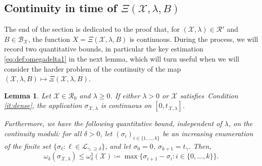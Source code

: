 \documentclass[11pt]{article}
\newtheorem{lemma}[theorem]{Lemma}
\def\Conf{{\mathscr{R}}}
\def\Att{{\Xi}}
\begin{document}
\subsection{Continuity in time of \texorpdfstring{$\Att(\mathcal{X},\lambda,B)$}{Xi(gamma,L,lambda,B)}}
\label{sub:cont}
The end of the section is dedicated to the proof that, for $(\mathcal{X},\lambda)\in \Conf'$ and $B\in\mathcal{B}_\mathcal{X}$, the function $X=\Att(\mathcal{X},\lambda,B)$ is continuous. During the process, we will record two quantitative bounds, in particular the key estimation \eqref{eq:def:omegadelta1} in the next lemma, which will turn useful when we will consider the harder problem of the continuity of the map $(\mathcal{X},\lambda,B)\mapsto \Att(\mathcal{X},\lambda,B)$.
\begin{lemma}
\label{le:sigmaIsCont}
  Let $\mathcal{X}\in \Conf_0$ and $\lambda\geq 0$.
  If either $\lambda>0$ or $\mathcal{X}$  satisfies~Condition \eqref{it:dense}, the application $\sigma_{\mathcal{X},\lambda}$ is continuous on $[0,t_{\mathcal{X},\lambda}]$.

  Furthermore, we have the following quantitative bound, independent of $\lambda$, on the continuity moduli: for all $\delta>0$, let $(\sigma_i)_{i\in \{1,\dots, k\}}$ be an increasing enumeration of the finite set $\{ \sigma_{\ell}: \ell\in \mathcal{L}_{\gamma,\geq \delta} \}$, and let $\sigma_0=0$, $\sigma_{k+1}=t_\gamma$. Then,
  \begin{equation}
  \label{eq:def:omegadelta1}
  \omega_\delta(\sigma_{\mathcal{X},\lambda})\leq \omega^1_{\delta}(\mathcal{X})\coloneqq  \max \{ \sigma_{i+1}-\sigma_i : i\in \{0,\dots, k\} \}.
  \end{equation}
\end{lemma}
\end{document}
